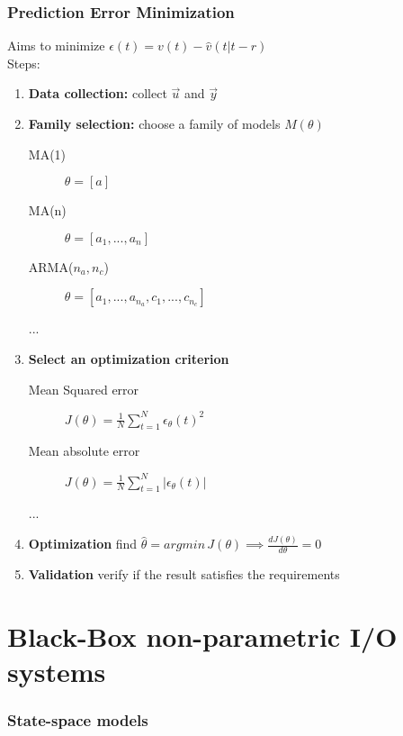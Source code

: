 \documentclass{article}
\let\OldPart\part
\renewcommand{\part}{\newpage\OldPart}
\begin{document}
\section{Prediction Error Minimization} Aims to minimize $\epsilon(t)=v(t)-\hat{v}(t|t-r)$\\
Steps:
\begin{enumerate}
\item \textbf{Data collection:} collect $\vec{u}$ and $\vec{y}$
\item \textbf{Family selection:} choose a family of models $M(\theta)$
	\begin{description}
	\item[MA(1)] $\theta=[a]$
	\item[MA(n)] $\theta=[a_1,...,a_n]$
	\item[ARMA($n_a,n_c$)] $\theta=[a_1,...,a_{n_a},
	c_1,...,c_{n_c}]$
	\item[...]
	\end{description}
\item \textbf{Select an optimization criterion}
	\begin{description}
	\item[Mean Squared error] $J(\theta)=\frac{1}{N}\sum_{t=1}^N \epsilon_\theta(t)^2$
	\item[Mean absolute error] $J(\theta)=\frac{1}{N}\sum_{t=1}^N |\epsilon_\theta(t)|$
	\item[...]
	\end{description}
\item  \textbf{Optimization} find $\hat{\theta}=argmin\,J(\theta)\implies \frac{dJ(\theta)}{d\theta}=0$
\item \textbf{Validation} verify if the result satisfies the requirements
\end{enumerate}

\newpage
\appendix

\newpage
\part{Black-Box non-parametric I/O systems}
\section{State-space models}
\begin{center}
\end{center}
\end{document}
